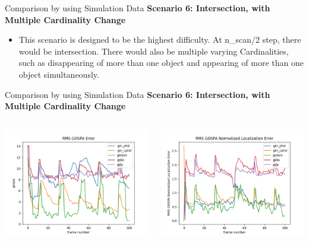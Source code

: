 \documentclass[12pt]{beamer}
\let\olditem\item
\renewcommand\item{\olditem\justifying}
\begin{document}
\begin{frame}{Comparison by using Simulation Data}
\textbf{Scenario 6: Intersection, with Multiple Cardinality Change}
	\begin{itemize}
		    \item This scenario is designed to be the highest difficulty. At n\_scan/2 step, there would be intersection. There would also be multiple varying Cardinalities, such as disappearing of more than one object and appearing of more than one object simultaneously.
	\end{itemize}
\end{frame}

\begin{frame}{Comparison by using Simulation Data}
\textbf{Scenario 6: Intersection, with Multiple Cardinality Change}
\begin{columns}[t]
  \begin{column}{0.5\linewidth}
      \centering
      \includegraphics[width=\linewidth,height=\textheight,keepaspectratio]{real_data/scenario6/gospa.png}\\
  \end{column}
    \begin{column}{0.5\linewidth}
      \centering
      \includegraphics[width=\linewidth,height=\textheight,keepaspectratio]{real_data/scenario6/gospa_localization.png}\\

\end{column}
\end{columns}
\end{frame}
\end{document}
